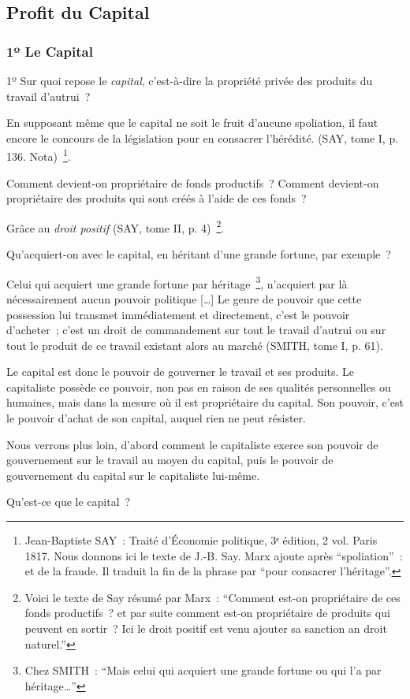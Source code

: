 \documentclass[french,twoside]{book} %
\newenvironment{quoteblock}%
  {\begin{quoting}}
  {\end{quoting}}
\newenvironment{quotebar}{%
    \def\FrameCommand{{\color{rubric!10!}\vrule width 0.5em} \hspace{0.9em}}%
    \def\OuterFrameSep{\itemsep} %
    \MakeFramed {\advance\hsize-\width \FrameRestore}
  }%
  {%
    \endMakeFramed
  }
\renewenvironment{quoteblock}%
  {%
    \savenotes
    \setstretch{0.9}
    \normalfont
    \begin{quotebar}
  }
  {%
    \end{quotebar}
    \spewnotes
  }
\begin{document}
\subsection[{Profit du Capital}]{Profit du Capital}
\subsubsection[{1º Le Capital}]{1º Le Capital}
\noindent 1º Sur quoi repose le \emph{capital}, c’est-à-dire la propriété privée des produits du travail d’autrui ?\par

\begin{quoteblock}
 \noindent En supposant même que le capital ne soit le fruit d’aucune spoliation, il faut encore le concours de la législation pour en consacrer l’hérédité. (SAY, tome I, p. 136. Nota) \footnote{Jean-Baptiste SAY : Traité d’Économie politique, 3ᵉ édition, 2 vol. Paris 1817. Nous donnons ici le texte de J.-B. Say. Marx ajoute après “spoliation” : et de la fraude. Il traduit la fin de la phrase par “pour consacrer l’héritage”.}.
 \end{quoteblock}

\noindent Comment devient-on propriétaire de fonds productifs ? Comment devient-on propriétaire des produits qui sont créés à l’aide de ces fonds ?\par
Grâce au \emph{droit positif} (SAY, tome II, p. 4) \footnote{Voici le texte de Say résumé par Marx : “Comment est-on propriétaire de ces fonds productifs ? et par suite comment est-on propriétaire de produits qui peuvent en sortir ? Ici le droit positif est venu ajouter sa sanction an droit naturel.”}.\par
Qu’acquiert-on avec le capital, en héritant d’une grande fortune, par exemple ?\par

\begin{quoteblock}
 \noindent Celui qui acquiert une grande fortune par héritage \footnote{Chez SMITH : “Mais celui qui acquiert une grande fortune ou qui l’a par héritage…”}, n’acquiert par là nécessairement aucun pouvoir politique […] Le genre de pouvoir que cette possession lui transmet immédiatement et directement, c’est le pouvoir d’acheter ; c’est un droit de commandement sur tout le travail d’autrui ou sur tout le produit de ce travail existant alors au marché (SMITH, tome I, p. 61).
 \end{quoteblock}

\noindent Le capital est donc le pouvoir de gouverner le travail et ses produits. Le capitaliste possède ce pouvoir, non pas en raison de ses qualités personnelles ou humaines, mais dans la mesure où il est propriétaire du capital. Son pouvoir, c’est le pouvoir d’achat de son capital, auquel rien ne peut résister.\par
Nous verrons plus loin, d’abord comment le capitaliste exerce son pouvoir de gouvernement sur le travail au moyen du capital, puis le pouvoir de gouvernement du capital sur le capitaliste lui-même.\par
Qu’est-ce que le capital ?\par
\end{document}
